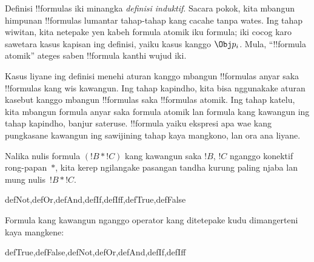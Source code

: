 \documentclass[../../../include/open-logic-section]{subfiles}
\begin{document}
\begin{explain}
Definisi !!{formula}s iki minangka \emph{definisi induktif}.
Sacara pokok, kita mbangun himpunan !!{formula}s lumantar tahap-tahap
kang cacahe tanpa wates. Ing tahap wiwitan, kita netepake yen kabeh
formula atomik iku formula; iki cocog karo sawetara kasus kapisan ing definisi,
yaiku kasus kanggo
%
%
$\Obj p_i$. Mula, ``!!{formula} atomik'' ateges saben !!{formula}
kanthi wujud iki.

Kasus liyane ing definisi menehi aturan kanggo mbangun !!{formula}s
anyar saka !!{formula}s kang wis kawangun. Ing tahap kapindho, kita
bisa nggunakake aturan kasebut kanggo mbangun !!{formula}s saka
!!{formula}s atomik. Ing tahap katelu, kita mbangun formula anyar saka
formula atomik lan formula kang kawangun ing tahap kapindho, banjur
sateruse. !!{formula} yaiku ekspresi apa wae kang pungkasane kawangun ing
sawijining tahap kaya mangkono, lan ora ana liyane.
\end{explain}

Nalika nulis formula $(!B \ast !C)$ kang kawangun saka $!B$, $!C$
nganggo konektif rong-papan~$\ast$, kita kerep ngilangake pasangan
tandha kurung paling njaba lan mung nulis~$!B \ast !C$.

\begin{tagblock}{defNot,defOr,defAnd,defIf,defIff,defTrue,defFalse}
\begin{defn}
Formula kang kawangun nganggo operator kang ditetepake kudu dimangerteni
kaya mangkene:

\begin{tagenumerate}{defTrue,defFalse,defNot,defOr,defAnd,defIf,defIff}







\end{tagenumerate}
\end{defn}
\end{tagblock}
\end{document}
